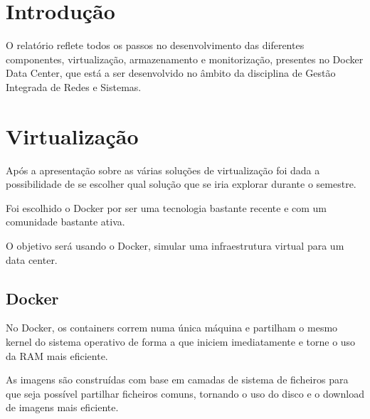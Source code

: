 \documentclass[pdftex,12pt,a4paper]{report}
\begin{document}
\renewcommand{\headrulewidth}{0pt}

\fancyhead{}
\fancyfoot{}
\rfoot{\thepage}

\renewcommand*\contentsname{Conteúdos}
\renewcommand*\figurename{Figura}
\renewcommand*\tablename{Tabela}

\tableofcontents
\renewcommand{\headrulewidth}{0.15pt}
\renewcommand{\thechapter}{}

\clearpage

\section{Introdução}

O relatório reflete todos os passos no desenvolvimento das diferentes componentes, virtualização, armazenamento e monitorização, presentes no Docker Data Center, que está a ser desenvolvido no âmbito da disciplina de Gestão Integrada de Redes e Sistemas. 

\newpage

\section{Virtualização}

Após a apresentação sobre as várias soluções de virtualização foi dada a possibilidade de se escolher qual solução que se iria explorar durante o semestre.

Foi escolhido o Docker por ser uma tecnologia bastante recente e com um comunidade bastante ativa.

O objetivo será usando o Docker, simular uma infraestrutura virtual para um data center.

\subsection{Docker}

No Docker, os containers correm numa única máquina e partilham o mesmo kernel do sistema operativo de forma a que iniciem imediatamente e torne o uso da RAM mais eficiente.

As imagens são construídas com base em camadas de sistema de ficheiros para que seja possível partilhar ficheiros comuns, tornando o uso do disco e o download de imagens mais eficiente.
\end{document}
